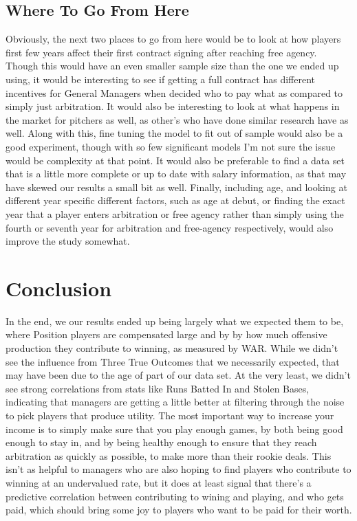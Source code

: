 \documentclass{article}
\begin{document}
\subsection{Where To Go From Here}
Obviously, the next two places to go from here would be to look at how players first few years affect their first contract signing after reaching free agency. Though this would have an even smaller sample size than the one we ended up using, it would be interesting to see if getting a full contract has different incentives for General Managers when decided who to pay what as compared to simply just arbitration. It would also be interesting to look at what happens in the market for pitchers as well, as other's who have done similar research have as well. Along with this, fine tuning the model to fit out of sample would also be a good experiment, though with so few significant models I'm not sure the issue would be complexity at that point. It would also be preferable to find a data set that is a little more complete or up to date with salary information, as that may have skewed our results a small bit as well. Finally, including age, and looking at different year specific different factors, such as age at debut, or finding the exact year that a player enters arbitration or free agency rather than simply using the fourth or seventh year for arbitration and free-agency respectively, would also improve the study somewhat.



\section{Conclusion}
In the end, we our results ended up being largely what we expected them to be, where Position players are compensated large and by by how much offensive production they contribute to winning, as measured by WAR. While we didn't see the influence from Three True Outcomes that we necessarily expected, that may have been due to the age of part of our data set. At the very least, we didn't see strong correlations from stats like Runs Batted In and Stolen Bases, indicating that managers are getting a little better at filtering through the noise to pick players that produce utility. The most important way to increase your income is to simply make sure that you play enough games, by both being good enough to stay in, and by being healthy enough to ensure that they reach arbitration as quickly as possible, to make more than their rookie deals. This isn't as helpful to managers who are also hoping to find players who contribute to winning at an undervalued rate, but it does at least signal that there's a predictive correlation between contributing to wining and playing, and who gets paid, which should bring some joy to players who want to be paid for their worth.
\end{document}
